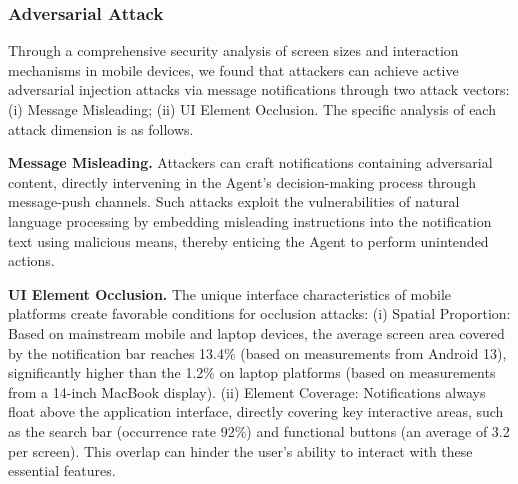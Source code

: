 \subsubsection{Adversarial Attack}
\label{sec:adversarial_attack}


Through a comprehensive security analysis of screen sizes and interaction mechanisms in mobile devices, we found that attackers can achieve active adversarial injection attacks via message notifications through two attack vectors: (i) Message Misleading; (ii) UI Element Occlusion. The specific analysis of each attack dimension is as follows.

\textbf{Message Misleading.} Attackers can craft notifications containing adversarial content, directly intervening in the Agent's decision-making process through message-push channels. Such attacks exploit the vulnerabilities of natural language processing by embedding misleading instructions into the notification text using malicious means, thereby enticing the Agent to perform unintended actions.

\textbf{UI Element Occlusion.} The unique interface characteristics of mobile platforms create favorable conditions for occlusion attacks: (i) Spatial Proportion: Based on mainstream mobile and laptop devices, the average screen area covered by the notification bar reaches 13.4\% (based on measurements from Android 13), significantly higher than the 1.2\% on laptop platforms (based on measurements from a 14-inch MacBook display). (ii) Element Coverage: Notifications always float above the application interface, directly covering key interactive areas, such as the search bar (occurrence rate 92\%) and functional buttons (an average of 3.2 per screen). This overlap can hinder the user's ability to interact with these essential features.

